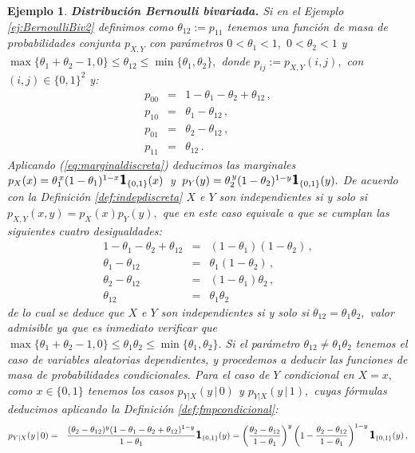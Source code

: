 \documentclass[spanish,10pt,letterpaper]{article}
\newtheorem{ejem}{Ejemplo}
\newcommand{\indic}{\textbf{\textsf{\large{1}}}}
\begin{document}
\begin{ejem}\label{ej:BernoulliBiv2a}
    \textbf{Distribución Bernoulli bivariada.} Si en el Ejemplo \ref{ej:BernoulliBiv2} definimos como $\theta_{12}:=p_{11}$ tenemos una función de masa de probabilidades conjunta $p_{X,Y}$ con parámetros $0<\theta_1<1,$ $0<\theta_2<1$ y $\max\{\theta_1+\theta_2-1,0\}\leq\theta_{12}\leq\min\{\theta_1,\theta_2\},$ donde $p_{ij}:=p_{X,Y}(i,j),$ con $(i,j)\in\{0,1\}^2$ y: 
    \begin{eqnarray*}
        p_{00} &=& 1 - \theta_1 -  \theta_2 + \theta_{12}\,,\\
        p_{10} &=& \theta_1 - \theta_{12}\,,\\
        p_{01} &=& \theta_2 - \theta_{12}\,,\\
        p_{11} &=& \theta_{12}\,.
    \end{eqnarray*}
    Aplicando (\ref{eq:marginaldiscreta}) deducimos las marginales $p_{X}(x)=\theta_1^{\,x}(1-\theta_1)^{1-x}\indic_{\{0,1\}}(x)\,$ y $\,p_{Y}(y)=\theta_2^{\,y}(1-\theta_2)^{1-y}\indic_{\{0,1\}}(y).$ De acuerdo con la Definición \ref{def:indepdiscreta} $X$ e $Y$ son independientes si y solo si $p_{X,Y}(x,y)=p_X(x)p_Y(y),$ que en este caso equivale a que se cumplan las siguientes cuatro desigualdades:
    \begin{eqnarray*}
        1 - \theta_1 -  \theta_2 + \theta_{12} &=& (1-\theta_1)(1-\theta_2) \,,\\
        \theta_1 - \theta_{12} &=& \theta_1(1-\theta_2) \,,\\
        \theta_2 - \theta_{12} &=& (1-\theta_1)\theta_2 \,,\\
        \theta_{12} &=& \theta_1\theta_2
    \end{eqnarray*}
    de lo cual se deduce que $X$ e $Y$ son independientes si y solo si $\theta_{12}=\theta_1\theta_2,$ valor admisible ya que es inmediato verificar que $\max\{\theta_1+\theta_2-1,0\}\leq\theta_1\theta_2\leq\min\{\theta_1,\theta_2\}.$ Si el parámetro $\theta_{12}\neq\theta_1\theta_2$ tenemos el caso de variables aleatorias dependientes, y procedemos a deducir las funciones de masa de probabilidades condicionales. Para el caso de $Y$ condicional en $X=x,$ como $x\in\{0,1\}$ tenemos los casos $p_{Y|X}(y\,|\,0)$ y $p_{Y|X}(y\,|\,1),$ cuyas fórmulas deducimos aplicando la Definición \ref{def:fmpcondicional}:
    \begin{eqnarray*}
        p_{Y|X}(y\,|\,0) &=& \frac{(\theta_2-\theta_{12})^y(1-\theta_1-\theta_2+\theta_{12})^{1-y}}{1-\theta_1}\indic_{\{0,1\}}(y) = \left(\frac{\theta_2-\theta_{12}}{1-\theta_1}\right)^y\left(1 - \frac{\theta_2-\theta_{12}}{1-\theta_1}\right)^{1-y}\indic_{\{0,1\}}(y) \,,\\

\end{eqnarray*}
\end{ejem}
\end{document}

